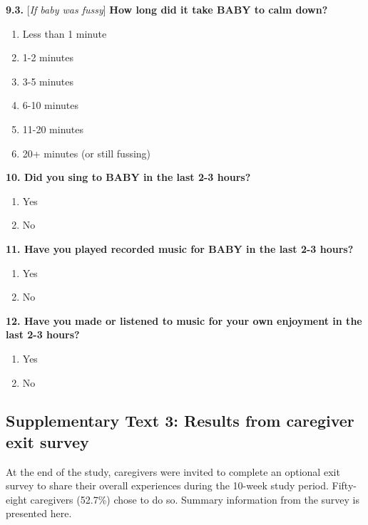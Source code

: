 \documentclass[
]{article}
\providecommand{\tightlist}{%
  \setlength{\itemsep}{0pt}\setlength{\parskip}{0pt}}
\begin{document}
\textbf{9.3.} {[}\emph{If baby was fussy}{]} \textbf{How long did it
take BABY to calm down?}

\begin{enumerate}
\def\labelenumi{\alph{enumi}.}
\tightlist
\item
  Less than 1 minute
\item
  1-2 minutes
\item
  3-5 minutes
\item
  6-10 minutes
\item
  11-20 minutes
\item
  20+ minutes (or still fussing)
\end{enumerate}

\textbf{10. Did you sing to BABY in the last 2-3 hours?}

\begin{enumerate}
\def\labelenumi{\alph{enumi}.}
\tightlist
\item
  Yes
\item
  No
\end{enumerate}

\textbf{11. Have you played recorded music for BABY in the last 2-3
hours?}

\begin{enumerate}
\def\labelenumi{\alph{enumi}.}
\tightlist
\item
  Yes
\item
  No
\end{enumerate}

\textbf{12. Have you made or listened to music for your own enjoyment in
the last 2-3 hours?}

\begin{enumerate}
\def\labelenumi{\alph{enumi}.}
\tightlist
\item
  Yes
\item
  No
\end{enumerate}

\subsection*{Supplementary Text 3: Results from caregiver exit
survey}\label{supplementary-text-3-results-from-caregiver-exit-survey}

At the end of the study, caregivers were invited to complete an optional
exit survey to share their overall experiences during the 10-week study
period. Fifty-eight caregivers (52.7\%) chose to do so. Summary
information from the survey is presented here.
\end{document}

